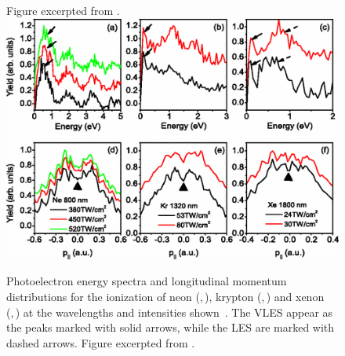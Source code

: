 \begin{figure}[t!]
{  Figure excerpted from .
  }
\label{f6-quan-original-figure}
%
%
%
%
%
%
%
  \centering
  \subfloat{\label{f6-wu-original-figure-a}}
  \subfloat{\label{f6-wu-original-figure-b}}
  \subfloat{\label{f6-wu-original-figure-c}}
  \subfloat{\label{f6-wu-original-figure-d}}
  \subfloat{\label{f6-wu-original-figure-e}}
  \subfloat{\label{f6-wu-original-figure-f}}
  \includegraphics[scale=0.6]{6-LES/Figures/figure6C.png}
  \caption[
  Characterization of Very Low Energy Structures by C.Y. Wu et al.
  ]{
  Photoelectron energy spectra and longitudinal momentum distributions for the ionization of neon (\protect{},\,\protect{}), krypton (\protect{},\,\protect{}) and xenon (\protect{},\,\protect{}) at the wavelengths and intensities shown~\cite{VLES_characterization}.
  The VLES appear as the peaks marked with solid arrows, while the LES are marked with dashed arrows.
  Figure excerpted from .
  }
\label{f6-wu-original-figure}
\end{figure}


